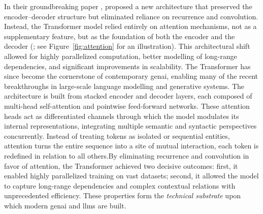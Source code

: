 In their groundbreaking paper , \textcite{vaswani2017a} proposed a new architecture that preserved the encoder–decoder structure but eliminated reliance on recurrence and convolution. Instead, the Transformer model relied entirely on attention mechanisms, not as a supplementary feature, but as the foundation of both the encoder and the decoder (\cite[1–2]{vaswani2017a}; see Figure~\ref{fig:attention} for an illustration). This architectural shift allowed for highly parallelized computation, better modelling of long-range dependencies, and significant improvements in scalability. The Transformer has since become the cornerstone of contemporary \gls{genai}, enabling many of the recent breakthroughs in large-scale language modelling and generative systems. The architecture is built from stacked encoder and decoder layers, each composed of multi-head self-attention and pointwise feed-forward networks. These attention heads act as differentiated channels through which the model modulates its internal representations, integrating multiple semantic and syntactic perspectives concurrently. Instead of treating \glspl{token} as isolated or sequential entities, attention turns the entire sequence into a site of mutual interaction, each token is redefined in relation to all others.By eliminating recurrence and convolution in favor of attention, the Transformer
achieved two decisive outcomes: first, it enabled highly parallelized training
on vast datasets; second, it allowed the model to capture long-range
dependencies and complex contextual relations with unprecedented efficiency.
These properties form the \emph{technical substrate} upon which modern
\gls{genai} and \glspl{llm} are built.


